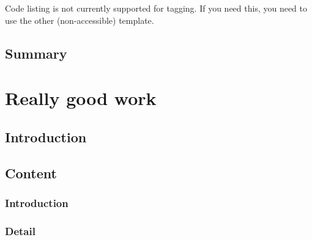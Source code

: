 \documentclass[times,12pt,thesis,online]{uom_thesis_casson} %
\begin{document}
    Code listing is not currently supported for tagging. If you need this, you need to use the other (non-accessible) template.

    
    
  
  \section{Summary}
    \lipsum[6] %
  
  
  
\chapter{Really good work} \label{sec:really_good_work}

  \section{Introduction}
    \lipsum[1] %
  
  \section{Content} \label{sec:content}
    \subsection{Introduction}
	\lipsum[1] %
	
	\subsection{Detail}
        \lipsum[7-11] %
    
\end{document}
